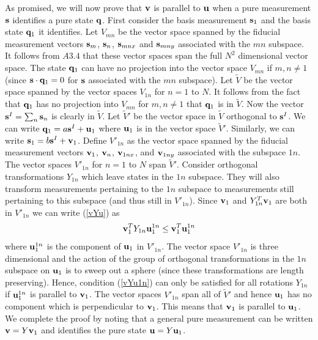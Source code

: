 \documentclass[10pt,twocolumn]{article}
\begin{document}
As promised, we will now prove that ${\bf v}$ is parallel to ${\bf u}$
when a pure
measurement ${\bf s}$ identifies a pure state ${\bf q}$.  First consider
the basis measurement ${\bf s}_1$ and the basis state ${\bf q}_1$ it
identifies.  Let $V_{mn}$ be the vector space spanned by the fiducial
measurement
vectors ${\bf s}_m$, ${\bf s}_n$, ${\bf s}_{mnx}$ and ${\bf s}_{mny}$
associated with the $mn$ subspace.  It follows from $A3.4$ that these
vector spaces span the full $N^2$ dimensional vector space.  The state
${\bf q}_1$ can have no projection into the vector space $V_{mn}$ if
$m,n\not=1$ (since ${\bf s}\cdot{\bf q}_1=0$ for ${\bf s}$ associated
with the $mn$ subspace).  Let $\widetilde{V}$ be the vector space
spanned by the vector spaces $V_{1n}$ for $n=1$ to $N$.  It follows from
the fact that ${\bf q}_1$ has no projection into $V_{mn}$ for
$m,n\not=1$ that ${\bf q}_1$
is in $\widetilde{V}$. Now the vector ${\bf s}^I=\sum_n {\bf s}_n$ is
clearly in $\widetilde{V}$. Let $\widetilde{V}'$ be the vector space in
$\widetilde{V}$ orthogonal to ${\bf s}^I$.  We can write ${\bf q}_1=a{\bf
s}^I+{\bf u}_1$ where ${\bf u}_1$ is in the vector space
$\widetilde{V}'$.  Similarly, we can write ${\bf s}_1=b{\bf s}^I+{\bf
v}_1$.
Define $V'_{1n}$ as the vector space spanned by the fiducial measurement
vectors ${\bf v}_1$, ${\bf v}_n$, ${\bf v}_{1nx}$, and ${\bf v}_{1ny}$
associated with the subspace $1n$.  The vector spaces $V'_{1n}$ for
$n=1$ to $N$ span $\widetilde{V}'$.  Consider
orthogonal transformations $Y_{1n}$
which leave states in the $1n$ subspace. They will also transform
measurements pertaining to the $1n$ subspace to measurements still
pertaining to this subspace (and thus still in $V'_{1n}$).  Since ${\bf
v}_1$ and $Y_{1n}^T{\bf v}_1$ are both in $V'_{1n}$ we can write
(\ref{vYu}) as
\begin{equation}\label{vYu1n}
{\bf v}_1^T Y_{1n} {\bf u}_1^{1n} \leq {\bf v}_1^T {\bf u}_1^{1n}
\end{equation}
where ${\bf u}_1^{1n}$ is the component of ${\bf u}_1$ in $V'_{1n}$.
The vector space $V'_{1n}$ is three dimensional
and the action of the group of orthogonal
transformations in the $1n$ subspace on ${\bf u}_1$ is to sweep out a
sphere (since these transformations are length preserving).
Hence, condition (\ref{vYu1n}) can only be satisfied for all rotations
$Y_{1n}$ if ${\bf u}_1^{1n}$ is parallel to ${\bf v}_1$.
The vector spaces $V'_{1n}$ span all of $\widetilde{V}'$ and
hence ${\bf u}_1$ has no component which is perpendicular to ${\bf
v}_1$.  This means that ${\bf v}_1$ is parallel to ${\bf u}_1$.  We
complete the proof by noting that a
general pure measurement can be written ${\bf v}=Y{\bf v}_1$ and
identifies the pure state ${\bf u}=Y{\bf u}_1$.
\end{document}
